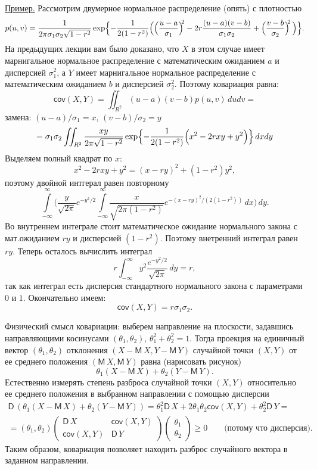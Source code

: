 \documentclass[12pt]{article}
\newcommand{\M}{{\mathsf M}\,}
\newcommand{\cov}{\mathsf{cov}}
\newcommand{\var}{\mathsf{D}\,}
\begin{document}
\underline{Пример.} Рассмотрим двумерное нормальное распределение (опять) с плотностью
\[
p(u,v)=\dfrac{1}{2\pi\sigma_1\sigma_2\sqrt{1-r^2}}%
\exp\Bigl\{-\dfrac{1}{2(1-r^2)}\Bigl(
\Bigl(\dfrac{u-a}{\sigma_1}\Bigr)^{\!\!2}-2r\dfrac{(u-a)(v-b)}{\sigma_1\sigma_2}
+ \Bigl(\dfrac{v-b}{\sigma_2}\Bigr)^{\!\!2}\,\Bigr)\Bigr\}.
\]
На предыдущих лекции вам было доказано, что $X$ в этом случае имеет марнигальное
нормальное распределение с математическим ожиданием $a$ и дисперсией $\sigma_1^2$, а $Y$
имеет марнигальное нормальное распределение с математическим ожиданием $b$ и дисперсией
$\sigma_2^2$. Поэтому ковариация равна:
\[
  \cov(X,Y)=\iint_{R^2} (u-a)(v-b) p(u,v)\,dudv=
\]
{замена: $(u-a)/\sigma_1=x$, $(v-b)/\sigma_2=y$}
\[ 
=\sigma_1\sigma_2\iint_{R^2}\dfrac{xy}{2\pi\sqrt{1-r^2}}
\exp\Bigl\{-\dfrac{1}{2(1-r^2)}\Bigl( x^2-2rxy+y^2\Bigr)\Bigr\}\,dxdy
\]
Выделяем полный квадрат по $x$:
\[
 x^2-2rxy+y^2 = (x-ry)^2+(1-r^2)y^2,
\]
поэтому двойной интгерал равен повторному
\[
  \int\limits_{-\infty}^\infty \biggl(\dfrac{y}{\sqrt{2\pi}} e^{-{y^2}/{2}} \int\limits_{-\infty}^\infty 
  \dfrac{x}{\sqrt{2\pi(1-r^2)}} e^{-(x-ry)^2/(2(1-r^2))}\,dx\biggr)\,dy.
\]
Во внутреннем интеграле стоит математическое ожидание нормального закона с мат.ожиданием
$ry$ и дисперсией $(1-r^2)$. Поэтому внетренний интеграл равен $ry$. Теперь осталось
вычислить интеграл
\[
r \int_{-\infty}^\infty y^2\dfrac{e^{-y^2/2}}{\sqrt{2\pi}}\,dy=r,
\]
так как интеграл есть дисперсия стандартного нормального закона с параметрами $0$ и
$1$. Окончательно имеем: 
\[
\cov(X,Y)=r\sigma_1\sigma_2.
\]

Физический смысл ковариации: выберем направление на плоскости, задавшись направляющими
косинусами $(\theta_1, \theta_2)$, $\theta^2_1+\theta_2^2=1$. Тогда проекция на единичный
вектор $(\theta_1, \theta_2)$ отклонения $(X-\M X, Y-\M Y)$ случайной точки $(X,Y)$ от ее
среднего положения $(\M X, \M Y)$ равна (нарисовать рисунок)
\[
\theta_1(X-\M X)+ \theta_2( Y-\M Y).
\]
Естественно измерять степень разброса случайной точки $(X, Y)$ относительно ее среднего
положения в выбранном направлении с помощью дисперсии
\begin{multline*}
\var(\theta_1(X-\M X)+ \theta_2( Y-\M Y)) = \theta_1^2 \var X +
2\theta_1\theta_2\cov(X,Y)+ \theta_2^2 \var Y =
 \\ =
 (\theta_1, \theta_2) 
 \begin{pmatrix}
   \var X & \cov(X,Y)\\
   \cov(X,Y) & \var Y
 \end{pmatrix}
 \begin{pmatrix}\theta_1\\ \theta_2
 \end{pmatrix} \geqslant 0 \qquad \text{(потому что дисперсия)}
 .
\end{multline*}
Таким образом, ковариация позволяет находить разброс случайного вектора в заданном
направлении. 
\end{document}
